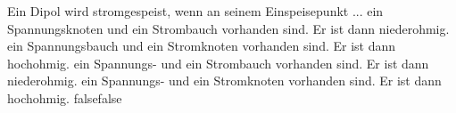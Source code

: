     {Ein Dipol wird stromgespeist, wenn an seinem Einspeisepunkt ...}
    {ein Spannungsknoten und ein Strombauch vorhanden sind. Er ist dann niederohmig.}
    {ein Spannungsbauch und ein Stromknoten vorhanden sind. Er ist dann hochohmig.}
    {ein Spannungs- und ein Strombauch vorhanden sind. Er ist dann niederohmig.}
    {ein Spannungs- und ein Stromknoten vorhanden sind. Er ist dann hochohmig.}
    {false}{false}